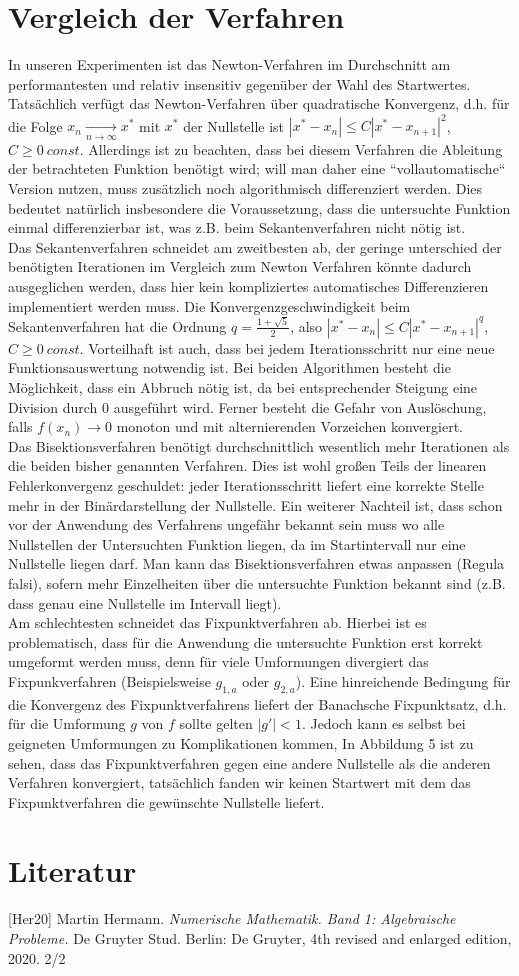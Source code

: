 \documentclass[a4paper,12pt]{article}
\newcommand{\1}{1\hspace{-0,9ex}1}
\begin{document}
\section*{Vergleich der Verfahren}
In unseren Experimenten ist das Newton-Verfahren im Durchschnitt am performantesten und relativ insensitiv gegenüber der Wahl des Startwertes. Tatsächlich verfügt das Newton-Verfahren über quadratische Konvergenz, d.h. für die Folge $x_n \underset{n\to\infty}{\longrightarrow} x^*$ mit $x^*$ der Nullstelle ist $|x^*-x_n|\leq C|x^*-x_{n+1}|^2$, $C\geq0\ const.$ Allerdings ist zu beachten, dass bei diesem Verfahren die Ableitung der betrachteten Funktion benötigt wird; will man daher eine ``vollautomatische`` Version nutzen, muss zusätzlich noch algorithmisch differenziert werden. Dies bedeutet natürlich insbesondere die Voraussetzung, dass die untersuchte Funktion einmal differenzierbar ist, was z.B. beim Sekantenverfahren nicht nötig ist. \\
Das Sekantenverfahren schneidet am zweitbesten ab, der geringe unterschied der benötigten Iterationen im Vergleich zum Newton Verfahren könnte dadurch ausgeglichen werden, dass hier kein kompliziertes automatisches Differenzieren implementiert werden muss. Die Konvergenzgeschwindigkeit beim Sekantenverfahren hat die Ordnung $q=\frac{1 + \sqrt{5}}{2}$, also $|x^*-x_n|\leq C|x^*-x_{n+1}|^q$, $C\geq0\ const$. Vorteilhaft ist auch, dass bei jedem Iterationsschritt nur eine neue Funktionsauswertung notwendig ist. Bei beiden Algorithmen besteht die Möglichkeit, dass ein Abbruch nötig ist, da bei entsprechender Steigung eine Division durch 0 ausgeführt wird. Ferner besteht die Gefahr von Auslöschung, falls $f(x_n)\to0$ monoton und mit alternierenden Vorzeichen konvergiert.\\
Das Bisektionsverfahren benötigt durchschnittlich wesentlich mehr Iterationen als die beiden bisher genannten Verfahren. Dies ist wohl großen Teils der linearen Fehlerkonvergenz geschuldet: jeder Iterationsschritt liefert eine korrekte Stelle mehr in der Binärdarstellung der Nullstelle. Ein weiterer Nachteil ist, dass schon vor der Anwendung des Verfahrens ungefähr bekannt sein muss wo alle Nullstellen der Untersuchten Funktion liegen, da im Startintervall nur eine Nullstelle liegen darf. Man kann das Bisektionsverfahren etwas anpassen (Regula falsi), sofern mehr Einzelheiten über die untersuchte Funktion bekannt sind (z.B. dass genau eine Nullstelle im Intervall liegt).\\
Am schlechtesten schneidet das Fixpunktverfahren ab. Hierbei ist es problematisch, dass für die Anwendung die untersuchte Funktion erst korrekt umgeformt werden muss, denn für viele Umformungen divergiert das Fixpunkverfahren (Beispielsweise $g_{1,a}$ oder $g_{2,a}$). Eine hinreichende Bedingung für die Konvergenz des Fixpunktverfahrens liefert der Banachsche Fixpunktsatz, d.h. für die Umformung $g$ von $f$ sollte gelten $|g'| < 1$. Jedoch kann es selbst bei geigneten Umformungen zu Komplikationen kommen, In Abbildung 5 ist zu sehen, dass das Fixpunktverfahren gegen eine andere Nullstelle als die anderen Verfahren konvergiert, tatsächlich fanden wir keinen Startwert mit dem das Fixpunktverfahren die gewünschte Nullstelle liefert.

\section*{Literatur}

[Her20] Martin Hermann. \textit{Numerische Mathematik. Band 1: Algebraische Probleme.} De Gruyter
Stud. Berlin: De Gruyter, 4th revised and enlarged edition, 2020.
2/2
\end{document}
